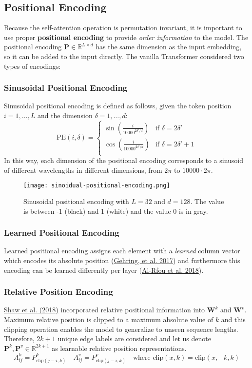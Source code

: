 \documentclass[12pt]{article}
\begin{document}
\subsection{Positional Encoding}
Because the self-attention operation is permutation invariant, it is important to use proper \textbf{positional encoding} to provide \emph{order information} to the model. The positional encoding $\mathbf{P} \in \mathbb{R}^{L \times d}$ has the same dimension as the input embedding, so it can be added to the input directly. The vanilla Transformer considered two types of encodings:

\subsubsection*{Sinusoidal Positional Encoding}
Sinusoidal positional encoding is defined as follows, given the token position $i=1,\dots,L$ and the dimension $\delta=1,\dots,d$:
\[
\text{PE}(i,\delta) = 
\begin{cases}
\sin\left(\frac{i}{10000^{2\delta'/d}}\right) & \text{if } \delta = 2\delta'\\
\cos\left(\frac{i}{10000^{2\delta'/d}}\right) & \text{if } \delta = 2\delta' + 1\\
\end{cases}
\]
In this way, each dimension of the positional encoding corresponds to a sinusoid of different wavelengths in different dimensions, from $2\pi$ to $10000 \cdot 2\pi$.

\begin{figure}[h!]
    \centering
    \texttt{[image: sinoidual-positional-encoding.png]}
    \caption{Sinusoidal positional encoding with $L=32$ and $d=128$. The value is between -1 (black) and 1 (white) and the value 0 is in gray.}
\end{figure}

\subsubsection*{Learned Positional Encoding}
Learned positional encoding assigns each element with a \emph{learned} column vector which encodes its absolute position (\href{https://arxiv.org/abs/1705.03122}{Gehring, et al. 2017}) and furthermore this encoding can be learned differently per layer (\href{https://arxiv.org/abs/1808.04444}{Al-Rfou et al. 2018}).

\subsubsection*{Relative Position Encoding}
\href{https://arxiv.org/abs/1803.02155}{Shaw et al. (2018)} incorporated relative positional information into $\mathbf{W}^k$ and $\mathbf{W}^v$. Maximum relative position is clipped to a maximum absolute value of $k$ and this clipping operation enables the model to generalize to unseen sequence lengths. Therefore, $2k + 1$ unique edge labels are considered and let us denote $\mathbf{P}^k, \mathbf{P}^v \in \mathbb{R}^{2k+1}$ as learnable relative position representations.
\[
A_{ij}^k = P^k_{\text{clip}(j - i, k)} \quad
A_{ij}^v = P^v_{\text{clip}(j - i, k)} \quad
\text{where }\text{clip}(x, k) = \text{clip}(x, -k, k)
\]
\end{document}
